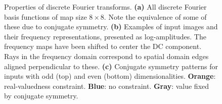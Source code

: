 \documentclass{article} %
\begin{document}
\begin{figure}[t]
\centering%
  \hfill
{}
  \hfill
{}
\caption{Properties of discrete Fourier transforms. {\bf (a)} All discrete Fourier basis functions of map size $8\times 8$. Note the equivalence of some of these due to conjugate symmetry. {\bf (b)} Examples of input images and their frequency representations, presented as log-amplitudes. The frequency maps have been shifted to center the DC component. Rays in the frequency domain correspond to spatial domain edges aligned perpendicular to these. {\bf (c)} Conjugate symmetry patterns for inputs with odd (top) and even (bottom) dimensionalities. {\bf Orange}: real-valuedness constraint. {\bf Blue}: no constraint. {\bf Gray}: value fixed by conjugate symmetry.}

\label{fig:dft}
\end{figure}
\end{document}
